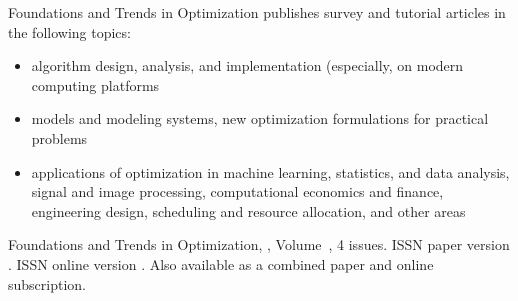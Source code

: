 


\journalaimsandscope
 {%
  Foundations and Trends\textsuperscript{\textregistered} in
Optimization publishes
 survey and tutorial articles in the following topics: 
\begin{itemize}
\item{algorithm design, analysis, and implementation (especially, on modern computing platforms}
\item{models and modeling systems, new optimization formulations for practical problems}
\item{applications of optimization in machine learning, statistics, and data analysis, signal and image processing, computational economics and finance, engineering design, scheduling and resource allocation, and other areas}
\end{itemize}
 }

\journallibraryinfo
 {%
  Foundations and Trends\textsuperscript{\textregistered} in
  Optimization, ,
  Volume~, 4 issues.
  ISSN paper version .
  ISSN online version .
  Also available as a combined paper and online
  subscription.
 } 